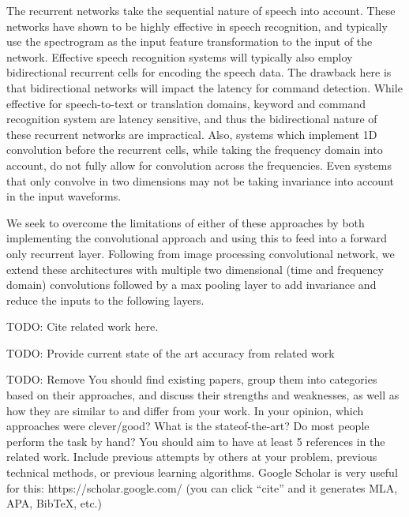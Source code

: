 \documentclass{article}
\begin{document}
The recurrent networks take the sequential nature of speech into
account. These networks have shown to be highly effective in speech
recognition, and typically use the spectrogram as the input feature
transformation to the input of the network. Effective speech
recognition systems will typically also employ bidirectional recurrent
cells for encoding the speech data. The drawback here is that
bidirectional networks will impact the latency for command
detection. While effective for speech-to-text or translation domains,
keyword and command recognition system are latency sensitive, and thus
the bidirectional nature of these recurrent networks are
impractical. Also, systems which implement 1D convolution before the
recurrent cells, while taking the frequency domain into account, do
not fully allow for convolution across the frequencies. Even systems
that only convolve in two dimensions may not be taking invariance into
account in the input waveforms.

We seek to overcome the limitations of either of these approaches by
both implementing the convolutional approach and using this to feed
into a forward only recurrent layer. Following from image processing
convolutional network, we extend these architectures with multiple two
dimensional (time and frequency domain) convolutions followed by a max
pooling layer to add invariance and reduce the inputs to the following
layers.

TODO: Cite related work here.

TODO: Provide current state of the art accuracy from related work

TODO: Remove
You should find existing papers, group them into categories based on their approaches,
and discuss their strengths and weaknesses, as well as how they are similar to and differ
from your work. In your opinion, which approaches were clever/good? What is the stateof-the-art?
Do most people perform the task by hand? You should aim to have at least
5 references in the related work. Include previous attempts by others at your problem,
previous technical methods, or previous learning algorithms. Google Scholar is very useful
for this: https://scholar.google.com/ (you can click “cite” and it generates MLA, APA,
BibTeX, etc.)
\end{document}
